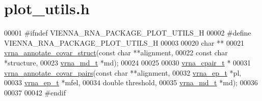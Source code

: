 \hypertarget{plot__utils_8h_source}{}\section{plot\+\_\+utils.\+h}
\label{plot__utils_8h_source}

\begin{DoxyCode}
00001 \textcolor{preprocessor}{#ifndef VIENNA\_RNA\_PACKAGE\_PLOT\_UTILS\_H}
00002 \textcolor{preprocessor}{#define VIENNA\_RNA\_PACKAGE\_PLOT\_UTILS\_H}
00003 
00020 \textcolor{keywordtype}{char} **
00021 \mbox{\hyperlink{group__annotation__utils_gae0305bbf95eddd4a57648a1e4739a7f3}{vrna\_annotate\_covar\_struct}}(\textcolor{keyword}{const} \textcolor{keywordtype}{char} **alignment,
00022                            \textcolor{keyword}{const} \textcolor{keywordtype}{char} *structure,
00023                            \mbox{\hyperlink{group__model__details_structvrna__md__s}{vrna\_md\_t}}  *md);
00024 
00025 
00030 \mbox{\hyperlink{group__data__structures_structvrna__cpair__s}{vrna\_cpair\_t}} *
00031 \mbox{\hyperlink{group__annotation__utils_gadb9ba32197f05d5876d389b2ba92edac}{vrna\_annotate\_covar\_pairs}}(\textcolor{keyword}{const} \textcolor{keywordtype}{char}  **alignment,
00032                           \mbox{\hyperlink{group__struct__utils_structvrna__elem__prob__s}{vrna\_ep\_t}}   *pl,
00033                           \mbox{\hyperlink{group__struct__utils_structvrna__elem__prob__s}{vrna\_ep\_t}}   *mfel,
00034                           \textcolor{keywordtype}{double}      threshold,
00035                           \mbox{\hyperlink{group__model__details_structvrna__md__s}{vrna\_md\_t}}   *md);
00036 
00037 
00042 \textcolor{preprocessor}{#endif}
\end{DoxyCode}

